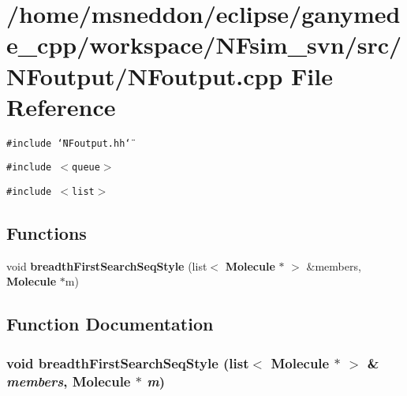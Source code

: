 \section{/home/msneddon/eclipse/ganymede\_\-cpp/workspace/NFsim\_\-svn/src/NFoutput/NFoutput.cpp File Reference}
\label{NFoutput_8cpp}


{\tt \#include \char`\"{}NFoutput.hh\char`\"{}}\par
{\tt \#include $<$queue$>$}\par
{\tt \#include $<$list$>$}\par
\subsection*{Functions}
\begin{CompactItemize}
\item 
void {\bf breadthFirstSearchSeqStyle} (list$<$ {\bf Molecule} $\ast$ $>$ \&members, {\bf Molecule} $\ast$m)
\end{CompactItemize}


\subsection{Function Documentation}
\subsubsection{\setlength{\rightskip}{0pt plus 5cm}void breadthFirstSearchSeqStyle (list$<$ {\bf Molecule} $\ast$ $>$ \& {\em members}, {\bf Molecule} $\ast$ {\em m})}\label{NFoutput_8cpp_7ceb827234c431e04430e7234c7dfe5c}



